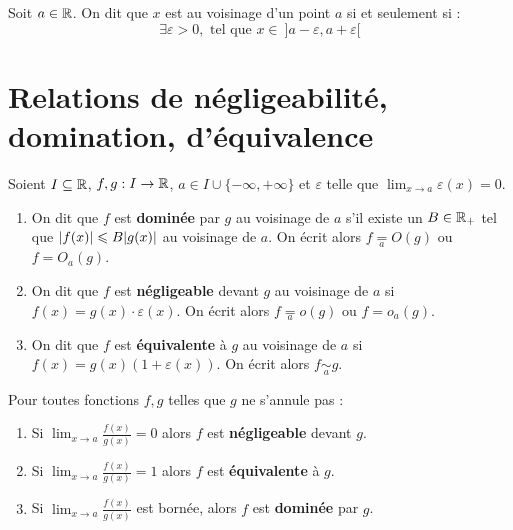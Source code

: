 \begin{definition} 
    Soit $a \in \mathbb{R}$.
    On dit que $x$ est au voisinage d'un point $a$ si et seulement si :
    \[ \exists \varepsilon > 0, \text{ tel que } x \in \ ]a - \varepsilon, a + \varepsilon[ \]
\end{definition}

\section{Relations de négligeabilité, domination, d'équivalence}
\begin{definition}
    Soient $I \subseteq \mathbb{R}$, $f, g : I \to \mathbb{R}$, $a \in I \cup \{-\infty, +\infty\}$ et $\varepsilon$ telle que $\lim_{x \to a} \varepsilon(x) = 0$.
    \begin{enumerate}
        \item On dit que $f$ est \textbf{dominée} par $g$ au voisinage de $a$ s'il existe un $B \in \mathbb{R}_+$ tel que $\abs{f(x)} \leqslant B \abs{g(x)}$ au voisinage de $a$. 
        On écrit alors $f \underset{a}{=} O(g)$ ou $f = O_a(g)$.
        \item On dit que $f$ est \textbf{négligeable} devant $g$ au voisinage de $a$ si $f(x) = g(x) \cdot \varepsilon(x)$.
        On écrit alors $f \underset{a}{=} o(g)$ ou $f = o_a(g)$.
        \item On dit que $f$ est \textbf{équivalente} à $g$ au voisinage de $a$ si $f(x) = g(x) (1 + \varepsilon(x))$.
        On écrit alors $f \underset{a}{\sim} g$.
    \end{enumerate}
\end{definition}

\begin{proposition}
	Pour toutes fonctions $f, g$ telles que $g$ ne s'annule pas :
    \begin{enumerate}
        \item Si $\lim_{x \to a} \frac{f(x)}{g(x)} = 0$ alors $f$ est \textbf{négligeable} devant $g$.
        \item Si $\lim_{x \to a} \frac{f(x)}{g(x)} = 1$ alors $f$ est \textbf{équivalente} à $g$.
        \item Si $\lim_{x \to a} \frac{f(x)}{g(x)}$ est bornée, alors $f$ est \textbf{dominée} par $g$.
    \end{enumerate}   
\end{proposition}

